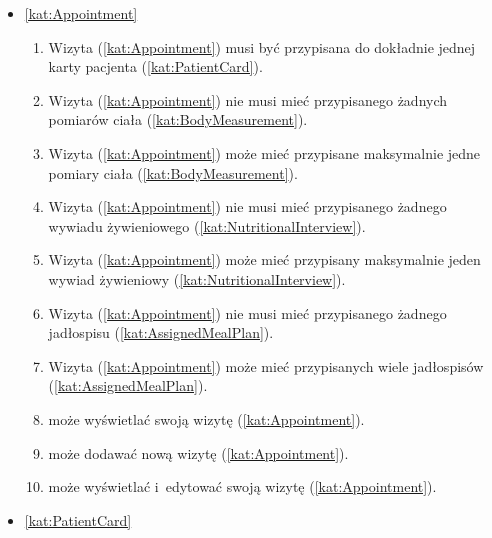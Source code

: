 \begin{itemize}[label={\textbf{Reguły dla}}, wide, labelwidth=!, labelindent=0pt]
    \setlength\itemsep{1.75em}
    \item\ref{kat:Appointment}\mynobreakpar
    \begin{enumerate}[label={\textbf{REG/5/\protect\twodigits{\arabic{enumi}}}}, wide, labelwidth=!, align=left, leftmargin=3cm]
        \item Wizyta (\ref{kat:Appointment}) musi być przypisana do dokładnie jednej karty pacjenta (\ref{kat:PatientCard}).
        \item Wizyta (\ref{kat:Appointment}) nie musi mieć przypisanego żadnych pomiarów ciała (\ref{kat:BodyMeasurement}).
        \item Wizyta (\ref{kat:Appointment}) może mieć przypisane maksymalnie jedne pomiary ciała (\ref{kat:BodyMeasurement}).
        \item Wizyta (\ref{kat:Appointment}) nie musi mieć przypisanego żadnego wywiadu żywieniowego (\ref{kat:NutritionalInterview}).
        \item Wizyta (\ref{kat:Appointment}) może mieć przypisany maksymalnie jeden wywiad żywieniowy (\ref{kat:NutritionalInterview}).
        \item Wizyta (\ref{kat:Appointment}) nie musi mieć przypisanego żadnego jadłospisu (\ref{kat:AssignedMealPlan}).
        \item Wizyta (\ref{kat:Appointment}) może mieć przypisanych wiele jadłospisów (\ref{kat:AssignedMealPlan}).
        \item {} może wyświetlać swoją wizytę (\ref{kat:Appointment}).
        \item {} może dodawać nową wizytę (\ref{kat:Appointment}).
        \item {} może wyświetlać i~edytować swoją wizytę (\ref{kat:Appointment}).
    \end{enumerate}
    \item\ref{kat:PatientCard}\mynobreakpar
    \begin{enumerate}[label={\textbf{REG/5/\protect\twodigits{\arabic{enumi}}}}, wide, labelwidth=!, align=left, leftmargin=3cm, resume]

\end{enumerate}
\end{itemize}
